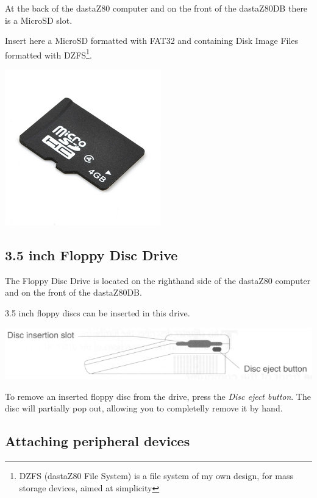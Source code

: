     At the back of the dastaZ80 computer and on the front of the dastaZ80DB
    there is a MicroSD slot.

    Insert here a MicroSD formatted with FAT32 and containing Disk Image
    Files formatted with DZFS\footnote{DZFS (dastaZ80 File System) is a file
    system of my own design, for mass storage devices, aimed at simplicity}.

    \centerline{\includegraphics[scale=0.5]{images/microsdcard.png}}

    \subsection{3.5 inch Floppy Disc Drive}

    The Floppy Disc Drive is located on the righthand side of the dastaZ80
    computer and on the front of the dastaZ80DB.

    3.5 inch floppy discs can be inserted in this drive. 

    \includegraphics[scale=0.7]{images/discslot.png}

    To remove an inserted floppy disc from the drive, press the
    \textit{Disc eject button}. The disc will partially pop out, allowing you to
    completelly remove it by hand.

    \subsection{Attaching peripheral devices}

